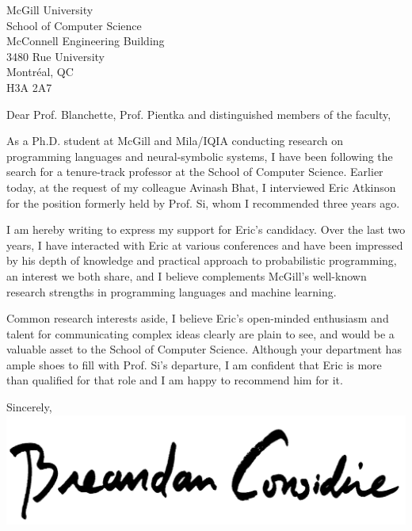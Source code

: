 \documentclass{letter}
\begin{document}
\begin{letter}{McGill University\\ School of Computer Science\\ McConnell Engineering Building\\ 3480 Rue University\\ Montr\'eal, QC\\ H3A 2A7}
  \opening{Dear Prof. Blanchette, Prof. Pientka and distinguished members of the faculty,}
  \vspace{12pt}

  As a Ph.D. student at McGill and Mila/IQIA conducting research on programming languages and neural-symbolic systems, I have been following the search for a tenure-track professor at the School of Computer Science. Earlier today, at the request of my colleague Avinash Bhat, I interviewed Eric Atkinson for the position formerly held by Prof. Si, whom I recommended three years ago.

  I am hereby writing to express my support for Eric's candidacy. Over the last two years, I have interacted with Eric at various conferences and have been impressed by his depth of knowledge and practical approach to probabilistic programming, an interest we both share, and I believe complements McGill's well-known research strengths in programming languages and machine learning.

  Common research interests aside, I believe Eric's open-minded enthusiasm and talent for communicating complex ideas clearly are plain to see, and would be a valuable asset to the School of Computer Science. Although your department has ample shoes to fill with Prof. Si's departure, I am confident that Eric is more than qualified for that role and I am happy to recommend him for it.
  \vspace{10pt}

  \closing{Sincerely,\\
  \includegraphics[scale=0.06]{signature}\\
  }
\end{letter}
\end{document}
